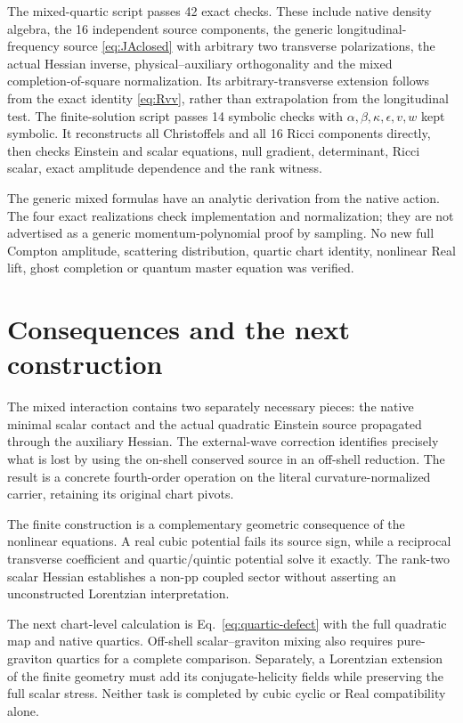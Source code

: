 \documentclass[11pt]{article}
\begin{document}
The mixed-quartic script passes 42 exact checks.
These include native density algebra, the 16 independent source components, the generic longitudinal-frequency source \eqref{eq:JAclosed} with arbitrary two transverse polarizations, the actual Hessian inverse, physical--auxiliary orthogonality and the mixed completion-of-square normalization.
Its arbitrary-transverse extension follows from the exact identity \eqref{eq:Rvv}, rather than extrapolation from the longitudinal test.
The finite-solution script passes 14 symbolic checks with \(\alpha,\beta,\kappa,\epsilon,v,w\) kept symbolic.
It reconstructs all Christoffels and all 16 Ricci components directly, then checks Einstein and scalar equations, null gradient, determinant, Ricci scalar, exact amplitude dependence and the rank witness.

The generic mixed formulas have an analytic derivation from the native action.
The four exact realizations check implementation and normalization; they are not advertised as a generic momentum-polynomial proof by sampling.
No new full Compton amplitude, scattering distribution, quartic chart identity, nonlinear Real lift, ghost completion or quantum master equation was verified.

\section{Consequences and the next construction}

The mixed interaction contains two separately necessary pieces: the native minimal scalar contact and the actual quadratic Einstein source propagated through the auxiliary Hessian.
The external-wave correction identifies precisely what is lost by using the on-shell conserved source in an off-shell reduction.
The result is a concrete fourth-order operation on the literal curvature-normalized carrier, retaining its original chart pivots.

The finite construction is a complementary geometric consequence of the nonlinear equations.
A real cubic potential fails its source sign, while a reciprocal transverse coefficient and quartic/quintic potential solve it exactly.
The rank-two scalar Hessian establishes a non-pp coupled sector without asserting an unconstructed Lorentzian interpretation.

The next chart-level calculation is Eq.~\eqref{eq:quartic-defect} with the full quadratic map and native quartics.
Off-shell scalar--graviton mixing also requires pure-graviton quartics for a complete comparison.
Separately, a Lorentzian extension of the finite geometry must add its conjugate-helicity fields while preserving the full scalar stress.
Neither task is completed by cubic cyclic or Real compatibility alone.
\end{document}
